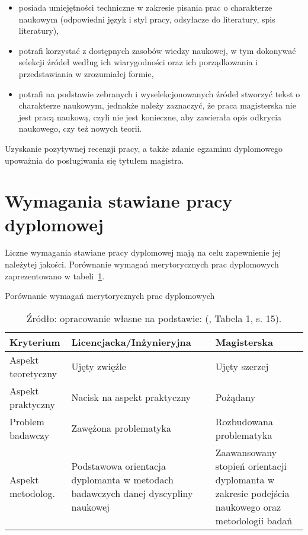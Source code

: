 \begin{itemize}
	\item posiada umiejętności  techniczne w zakresie pisania prac o charakterze naukowym (odpowiedni język i styl pracy, odsyłacze do literatury, spis literatury),
    \item potrafi korzystać z dostępnych zasobów wiedzy naukowej, w tym dokonywać selekcji źródeł według ich wiarygodności oraz ich porządkowania i przedstawiania w zrozumiałej formie,
    \item potrafi na podstawie zebranych i wyselekcjonowanych źródeł stworzyć tekst o charakterze naukowym, jednakże należy zaznaczyć, że praca magisterska nie jest pracą naukową, czyli nie jest konieczne, aby zawierała opis odkrycia naukowego, czy też nowych teorii.
\end{itemize}

Uzyskanie pozytywnej recenzji pracy, a także zdanie egzaminu dyplomowego upoważnia do posługiwania się tytułem magistra.


\section{Wymagania stawiane pracy dyplomowej}

Liczne wymagania stawiane pracy dyplomowej mają na celu zapewnienie jej należytej jakości. Porównanie wymagań merytorycznych prac dyplomowych zaprezentowano w tabeli~\ref{tab:porownanie}.

\begin{table}[ht]
	\centering
	\caption{Porównanie wymagań merytorycznych prac dyplomowych}
	\begin{tabularx}{\textwidth}{l X X}
		\hline
		\textbf{Kryterium} & \textbf{Licencjacka/Inżynieryjna} & \textbf{Magisterska}\\
		\hline
		Aspekt teoretyczny & Ujęty zwięźle  & Ujęty szerzej\\
		Aspekt praktyczny & Nacisk na aspekt praktyczny & Pożądany\\
		Problem badawczy & Zawężona problematyka &  Rozbudowana problematyka\\
		Aspekt metodolog. & Podstawowa orientacja dyplomanta w metodach badawczych danej dyscypliny naukowej & Zaawansowany stopień orientacji dyplomanta w zakresie podejścia naukowego oraz metodologii badań \\
		\hline		
	\end{tabularx}
	\caption*{Źródło: opracowanie własne na podstawie: (\citealt{dudziakZejmo}, Tabela 1, s. 15).}
	\label{tab:porownanie}
\end{table}

